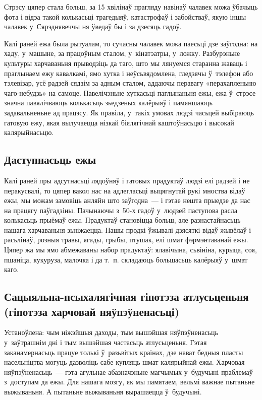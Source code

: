 Стрэсу цяпер стала больш, за 15 хвілінаў прагляду навінаў чалавек можа ўбачыць фота і відэа такой колькасьці трагедыяў, катастрофаў і забойстваў, якую іншы чалавек у~Сярэднявеччы ня ўведаў бы і за дзесяць гадоў.

Калі раней ежа была рытуалам, то сучасны чалавек можа паесьці дзе заўгодна: на хаду, у~машыне, за працоўным сталом, у~кінатэатры, у~ложку. Разбурэньне культуры харчаваньня прыводзіць да таго, што мы лянуемся старанна жаваць і праглынаем ежу кавалкамі, ямо хутка і неўсьвядомлена, гледзячы ў~тэлефон або тэлевізар, усё радзей сядзім за адным сталом, аддаючы перавагу «перахапленьню чаго-небудзь» на самоце. Павелічэньне хуткасьці паглынаньня ежы, ежа ў~стрэсе значна павялічваюць колькасьць зьедзеных калёрыяў і памяншаюць задавальненьне ад працэсу. Як правіла, у~такіх умовах людзі часьцей выбіраюць гатовую ежу, якая вылучаецца нізкай біялягічнай каштоўнасьцю і высокай калярыйнасьцю.

\subsection*{Даступнасьць ежы}

Калі раней пры адсутнасьці лядоўняў і гатовых прадуктаў людзі елі радзей і не перакусвалі, то цяпер вакол нас на адлегласьці выцягнутай рукі мноства відаў ежы, мы можам замовіць анляйн што заўгодна~--- і гэтае нешта прыедзе да нас на працягу паўгадзіны. Пачынаючы з~50-х гадоў у~людзей паступова расла колькасьць прыёмаў ежы. Прадуктаў становіцца больш, але разнастайнасьць нашага харчаваньня зьніжаецца. Нашы продкі ўжывалі дзясяткі відаў жывёлаў і расьлінаў, розныя травы, ягады, грыбы, птушак, елі шмат фэрмэнтаванай ежы. Цяпер жа мы ямо абмежаваны набор прадуктаў: ялавічына, сьвініна, курыца, соя, пшаніца, кукуруза, малочка і да т.~п. складаюць большасьць калёрыяў у~шмат каго.

\subsection*{Сацыяльна-псыхалягічная гіпотэза атлусьценьня (гіпотэза харчовай няўпэўненасьці)}

Устаноўлена: чым ніжэйшыя даходы, тым вышэйшая няўпэўненасьць у~заўтрашнім дні і тым вышэйшая частасьць атлусьценьня. Гэтая заканамернасьць працуе толькі ў~разьвітых краінах, дзе нават бедныя пласты насельніцтва могуць дазволіць сабе купляць шмат калярыйнай ежы. Харчовая няўпэўненасьць~--- гэта агульнае абазначэньне магчымых у~будучыні праблемаў з~доступам да ежы. Для нашага мозгу, як мы памятаем, вельмі важнае пытаньне выжываньня. А пытаньне выжываньня вырашаецца ў~будучыні.

